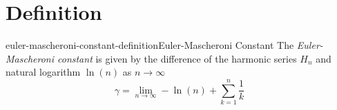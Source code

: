 \documentclass[preview]{standalone}
\begin{document}
\genpage

\section{Definition}

\begin{snippetdefinition}{euler-mascheroni-constant-definition}{Euler-Mascheroni Constant}
    The \textit{Euler-Mascheroni constant} is given by the difference
    of the harmonic series \(H_n\) and natural logarithm \(\ln(n)\) as \(n\to \infty\)
    \[
        \gamma = \lim_{n\to\infty} -\ln(n)+\sum_{k=1}^{n}\frac{1}{k}
    \]
\end{snippetdefinition}
\end{document}

